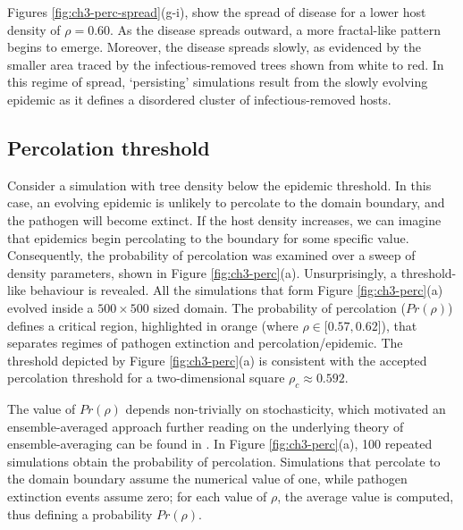 Figures \ref{fig:ch3-perc-spread}(g-i), show the spread of disease for a lower host density of $\rho = 0.60$.
As the disease spreads outward, a more fractal-like pattern begins to emerge.
Moreover, the disease spreads slowly, as evidenced by the smaller area traced by the infectious-removed trees shown from white to red.
In this regime of spread, `persisting' simulations result from the slowly evolving epidemic as it defines a disordered cluster of infectious-removed hosts.
\newpage

\subsection{Percolation threshold}
\label{section:universality}

Consider a simulation with tree density below the epidemic threshold. In this case, an evolving epidemic is unlikely to percolate to the domain boundary, and the pathogen will become extinct. If the host density increases, we can imagine that epidemics begin percolating to the boundary for some specific value.
Consequently, the probability of percolation was examined over a sweep of density parameters, shown in Figure \ref{fig:ch3-perc}(a).
Unsurprisingly, a threshold-like behaviour is revealed. All the simulations that form Figure \ref{fig:ch3-perc}(a) evolved inside a $500\times 500$ sized domain.
The probability of percolation ($Pr(\rho)$) defines a critical region, highlighted in orange (where $ \rho \in [0.57, 0.62$]), that separates regimes of pathogen extinction and percolation/epidemic. The threshold depicted by Figure \ref{fig:ch3-perc}(a) is consistent with the accepted percolation threshold for a two-dimensional square $\rho_c \approx 0.592$.

The value of $Pr(\rho)$ depends non-trivially on stochasticity, which motivated an ensemble-averaged approach\textemdash 
further reading on the underlying theory of ensemble-averaging can be found in \cite{gibbs1902elementary}.
In Figure \ref{fig:ch3-perc}(a), 100 repeated simulations obtain the probability of percolation. Simulations that percolate to the domain boundary assume the numerical value of one, while pathogen extinction events assume zero; for each value of $\rho$, the average value is computed, thus defining a probability $Pr(\rho)$.

